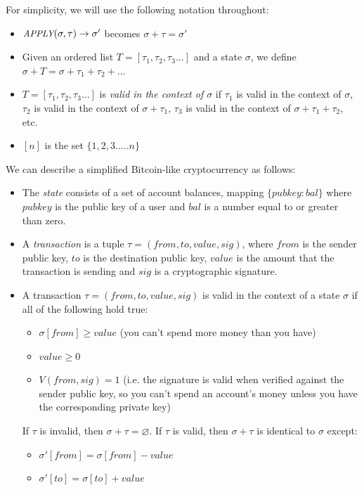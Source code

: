 \documentclass[11pt,a4paper]{article}
\makeatletter
\theoremstyle{plain}
\theoremstyle{definition}
\theoremstyle{remark}
\newcommand{\ie}{i.e.\@\xspace}
\newcommand{\makeintoafunction}[1]{\textit{\uppercase{\small #1}}}
\newcommand{\APPLY}{\makeintoafunction{apply}}
\makeatother
\begin{document}
For simplicity, we will use the following notation throughout:

\begin{itemize}
\item
$\APPLY(\sigma, \tau) \rightarrow \sigma'$ becomes $\sigma + \tau = \sigma'$
\item  
Given an ordered list $T = [\tau_1, \tau_2, \tau_3...]$ and a state $\sigma$, we define $\sigma + T = \sigma + \tau_1 + \tau_2 + ...$
\item
$T = [\tau_1, \tau_2, \tau_3 ...]$ is \emph{valid in the context of $\sigma$} if $\tau_1$ is valid in the context of $\sigma$, $\tau_2$ is valid in the context of $\sigma + \tau_1$, $\tau_3$ is valid in the context of $\sigma + \tau_1 + \tau_2$, etc.
\item
$[n]$ is the set $\{1, 2, 3..... n\}$
\end{itemize}

We can describe a simplified Bitcoin-like cryptocurrency as follows:

\begin{itemize}
\item
The \emph{state} consists of a set of account balances, mapping $\{pubkey: bal\}$ where $pubkey$ is the public key of a user and $bal$ is a number equal to or greater than zero.
\item
A \emph{transaction} is a tuple $\tau = (from, to, value, sig)$, where $from$ is the sender public key, $to$ is the destination public key, $value$ is the amount that the transaction is sending and $sig$ is a cryptographic signature.
\item
A transaction $\tau = (from, to, value, sig)$ is valid in the context of a state $\sigma$ if all of the following hold true:
    \begin{itemize}
    \item
    $\sigma[from] \ge value$ (you can't spend more money than you have)
    \item
    $value \ge 0$
    \item
    $V(from, sig) = 1$ (\ie the signature is valid when verified against the sender public key, so you can't spend an account's money unless you have the corresponding private key)
    \end{itemize}
If $\tau$ is invalid, then $\sigma + \tau = \varnothing$. If $\tau$ is valid, then $\sigma + \tau$ is identical to $\sigma$ except:
    \begin{itemize}
    \item
    $\sigma'[from] = \sigma[from] - value$
    \item
    $\sigma'[to] = \sigma[to] + value$
    \end{itemize}
\end{itemize}
\end{document}
